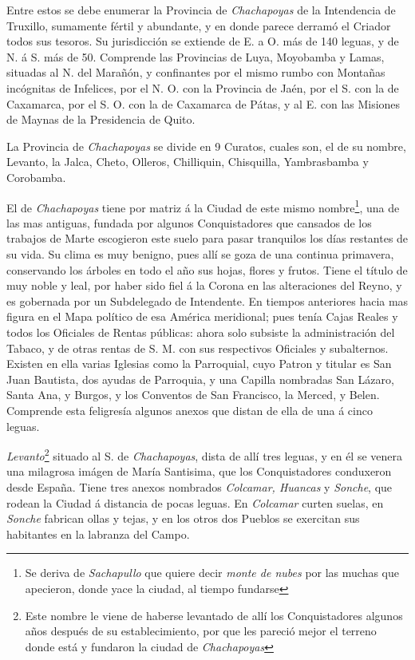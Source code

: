 \documentclass[12pt,a4paper]{article}
\begin{document}
Entre estos se debe enumerar la Provincia de  \emph{Chachapoyas} de la Intendencia de Truxillo, sumamente fértil y abundante, y en donde parece derramó el Criador todos sus tesoros. Su jurisdicción se extiende de E. a O. más de 140 leguas, y de N. á S. más de 50. Comprende las Provincias de Luya, Moyobamba y Lamas, situadas al N. del Marañón, y confinantes por el mismo rumbo con Montañas incógnitas de Infelices, por el N. O. con la Provincia de Jaén, por el S. con la de Caxamarca, por el S. O. con la de Caxamarca de Pátas, y al E. con las Misiones de Maynas de la Presidencia de Quito.

La Provincia de \emph{Chachapoyas} se divide en 9 Curatos, cuales son, el de su nombre, Levanto, la Jalca, Cheto, Olleros, Chilliquin, Chisquilla, Yambrasbamba y Corobamba.


El de \emph{Chachapoyas} tiene por matriz á la Ciudad de este mismo nombre\footnote{Se deriva de \emph{Sachapullo} que quiere decir \emph{monte de nubes} por las muchas que apecieron, donde yace la ciudad, al tiempo fundarse}, una de las mas antiguas, fundada por algunos Conquistadores que cansados de los trabajos de Marte escogieron este suelo para pasar tranquilos los días restantes de su vida. Su clima es muy benigno, pues allí se goza de una continua primavera, conservando los árboles en todo el año sus hojas, flores y frutos. Tiene el título de muy noble y leal, por haber sido fiel á la Corona en las alteraciones del Reyno, y es gobernada por un Subdelegado de Intendente. En tiempos anteriores hacia mas figura en el Mapa político de esa América meridional; pues tenía Cajas Reales y todos los Oficiales de Rentas públicas: ahora solo subsiste la administración del Tabaco, y de otras rentas de S. M. con sus respectivos Oficiales y subalternos. Existen en ella varias Iglesias como la Parroquial, cuyo Patron y titular es San Juan Bautista, dos ayudas de Parroquia, y una Capilla nombradas San Lázaro, Santa Ana, y Burgos, y los Conventos de San Francisco, la Merced, y Belen. Comprende esta feligresía algunos anexos que distan de ella de una á cinco leguas.


\emph{Levanto}\footnote{Este nombre le viene de haberse levantado de allí los Conquistadores algunos años después de su establecimiento, por que les pareció mejor el terreno donde está y fundaron la ciudad de \emph{Chachapoyas}} situado al S. de \emph{Chachapoyas}, dista de allí tres leguas, y en él se venera una milagrosa imágen de María Santisima, que los Conquistadores conduxeron desde España. Tiene tres anexos nombrados \emph{Colcamar, Huancas} y \emph{Sonche}, que rodean la Ciudad á distancia de pocas leguas. En \emph{Colcamar} curten suelas, en \emph{Sonche} fabrican ollas y tejas, y en los otros dos Pueblos se exercitan sus habitantes en la labranza del Campo.
\end{document}
